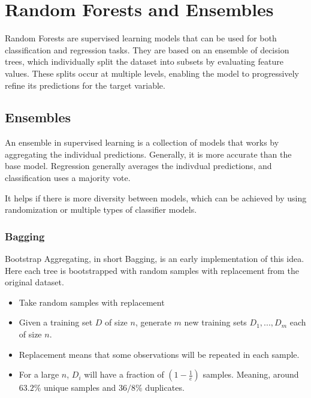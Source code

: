 \section{Random Forests and Ensembles}

Random Forests are supervised learning models that can be used for
both classification and regression tasks. They are based on an
ensemble of decision trees, which individually split the dataset into
subsets by evaluating feature values. These splits occur at multiple
levels, enabling the model to progressively refine its predictions
for the target variable.

\subsection{Ensembles}

An ensemble in supervised learning is a collection of models that
works by aggregating the individual predictions. Generally, it is more
accurate than the base model. Regression generally averages the indivdual
predictions, and classification uses a majority vote.

It helps if there is more diversity between models, which can be achieved by
using randomization or multiple types of classifier models.

\subsubsection{Bagging}

Bootstrap Aggregating, in short Bagging, is an early implementation of this
idea. Here each tree is bootstrapped with random samples with replacement
from the original dataset.

\begin{definition}[Bagging]
  \begin{itemize}
    \item Take random samples with replacement
    \item Given a training set $D$ of size $n$, generate $m$
      new training sets $D_1,...,D_m$ each of size $n$.
    \item Replacement means that some observations will be
      repeated in each sample.
    \item For a large $n$, $D_i$ will have a fraction of $(1 -
      \frac{1}{e})$ samples.
      Meaning, around $63.2\%$ unique samples and $36/8\%$ duplicates.
  \end{itemize}
\end{definition}

